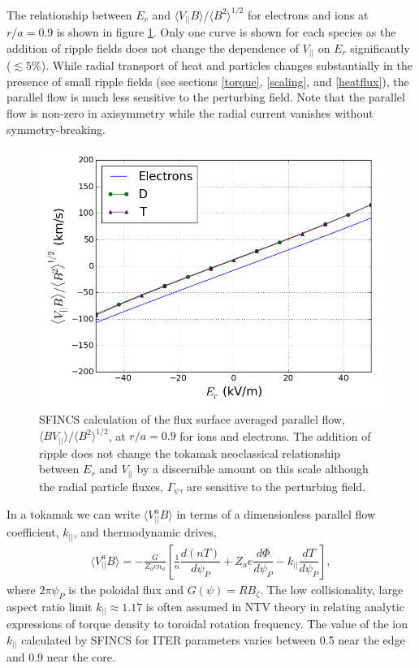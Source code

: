 \documentclass[aip, pop, preprint]{revtex4-1}
\numberwithin{figure}{section}
\numberwithin{equation}{section}
\newcommand{\der}[2]{\dfrac{d #1}{d  #2}}
\begin{document}
The relationship between $E_r$ and $\langle V_{||} B \rangle/\langle B^2 \rangle^{1/2}$ for electrons and ions at $r/a = 0.9$ is shown in figure \ref{fig:Er_flow}. Only one curve is shown for each species as the addition of ripple fields does not change the dependence of $V_{||}$ on $E_r$ significantly ($\lesssim 5 \%$). While radial transport of heat and particles changes substantially in the presence of small ripple fields (see sections \ref{torque}, \ref{scaling}, and \ref{heatflux}), the parallel flow is much less sensitive to the perturbing field. Note that the parallel flow is non-zero in axisymmetry while the radial current vanishes without symmetry-breaking. 

\begin{figure}[h!]
\centering
\includegraphics[width=.7\textwidth]{Er_flow.png}
\caption{\label{fig:Er_flow} SFINCS calculation of the flux surface averaged parallel flow, $\langle B V_{||} \rangle/\langle B^2 \rangle^{1/2}$, at $r/a = 0.9$ for ions and electrons. The addition of ripple does not change the tokamak neoclassical relationship between $E_r$ and $V_{||}$ by a discernible amount on this scale although the radial particle fluxes, $\Gamma_{\psi}$, are sensitive to the perturbing field.}
\end{figure}

In a tokamak we can write $\langle V_{||}^a B \rangle$ in terms of a dimensionless parallel flow coefficient, $k_{||}$, and thermodynamic drives,
\begin{gather}
\langle  V_{||}^a  B\rangle = -\frac{G}{Z_a e n_a} \left[ \frac{1}{n} \der{(nT)}{\psi_P} + Z_a e \der{\Phi}{\psi_P} - k_{||} \der{T}{\psi_P} \right],
\end{gather}
where $2 \pi \psi_P$ is the poloidal flux and $G(\psi) = R B_{\zeta}$. The low collisionality, large aspect ratio limit\cite{Hinton1976, Hirshman1981} $k_{||} \approx 1.17$ is often assumed in NTV theory\cite{Callen2011, Sun2011} in relating analytic expressions of torque density to toroidal rotation frequency. The value of the ion $k_{||}$ calculated by SFINCS for ITER parameters varies between 0.5 near the edge and 0.9 near the core. 
\end{document}

